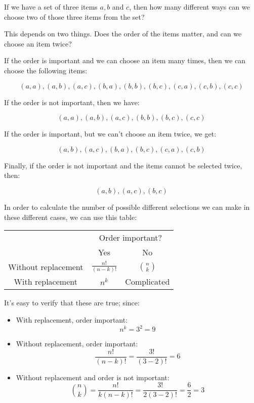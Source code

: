 If we have a set of three items $a, b$ and $c$, then how many different ways can
we choose two of those three items from the set?

This depends on two things. Does the order of the items matter, and can we
choose an item twice?

If the order is important and we can choose an item many times, then we can
choose the following items:

\begin{dmath*}
	(a,a), (a,b), (a,c), (b,a), (b,b), (b,c), (c,a), (c,b), (c,c)
\end{dmath*}

If the order is not important, then we have:

\begin{dmath*}
	(a,a), (a,b), (a,c), (b,b), (b,c), (c,c)
\end{dmath*}

If the order is important, but we can't choose an item twice, we get:

\begin{dmath*}
	(a,b), (a,c), (b,a), (b,c), (c,a), (c,b)
\end{dmath*}

Finally, if the order is not important and the items cannot be selected twice,
then:

\begin{dmath*}
	(a,b), (a,c), (b,c)
\end{dmath*}

In order to calculate the number of possible different selections we can make in
these different cases, we can use this table:

\begin{center}
\begin{tabular}{|c|c|c|}
	\hline
	& \multicolumn{2}{c|}{Order important?}\\
	\cline{2-3}
	& Yes & No\\ \hline
	Without replacement & $\frac{n!}{(n-k)!}$ & $n \choose k$\\ \hline
	With replacement & $n^k$ & Complicated\\ \hline
\end{tabular}
\end{center}

It's easy to verify that these are true; since:

\begin{itemize}
	\item With replacement, order important:
	\begin{dmath*}
		n^k = 3^2 = 9
	\end{dmath*}
	\item Without replacement, order important:
	\begin{dmath*}
		\frac{n!}{(n - k)!} = 	\frac{3!}{(3 - 2)!} = 6
	\end{dmath*}
	\item Without replacement and order is not important:
	\begin{dmath*}
		{n \choose k} = \frac{n!}{k(n - k)!} = \frac{3!}{2(3 - 2)!} = \frac{6}{2} = 3
	\end{dmath*}

\end{itemize}


